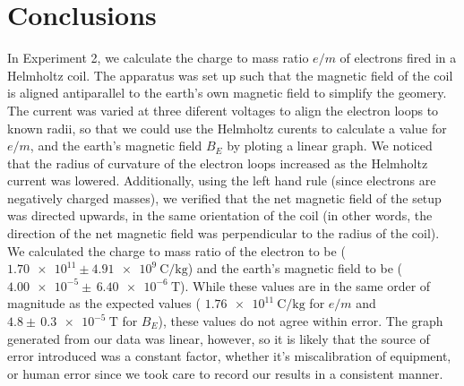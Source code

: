 \documentclass[letterpaper]{article}
\begin{document}
\section{Conclusions}
In Experiment 2, we calculate the charge to mass ratio $e/m$ of electrons fired in a Helmholtz coil. The apparatus
was set up such that the magnetic field of the coil is aligned antiparallel to the earth's own magnetic field
to simplify the geomery. The current was varied at three diferent voltages to align the electron loops to known radii, so that we could use the
Helmholtz curents to calculate a value for $e/m$, and the earth's magnetic field $B_E$ by ploting a linear graph. We noticed that the
radius of curvature of the electron loops increased as the Helmholtz current was lowered. Additionally, using the
left hand rule (since electrons are negatively charged masses), we verified that the net magnetic field of the
setup was directed upwards, in the same orientation of the coil (in other words, the direction of the net magnetic field
was perpendicular to the radius of the coil). We calculated the charge to mass ratio of the electron to be ($\num{1.70e11} \pm \SI{4.91e9}{\coulomb\per\kilogram}$)
and the earth's magnetic field to be
($\num{4.00e-5} \pm \,\SI{6.40e-6}{\tesla}$). While these values are in the same order of magnitude as the
expected values ( $\SI{1.76e11}{\coulomb\per\kilogram}$ for $e/m$
and $4.8 \pm \,\SI{0.3e-5}{\tesla}$ for $B_E$), these values do not agree within error. The
graph generated from our data was linear, however, so it is likely that the source of error introduced was a
constant factor, whether it's miscalibration of equipment, or human error since we took care to record our
results in a consistent manner.
\end{document}
